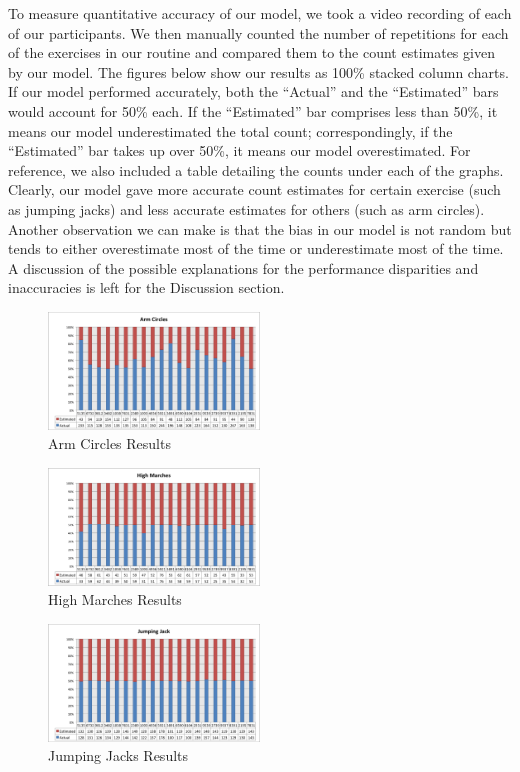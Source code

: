 To measure quantitative accuracy of our model, we took a video recording of each of our participants. We then manually counted the number of repetitions for each of the exercises in our routine and compared them to the count estimates given by our model. The figures below show our results as 100\% stacked column charts. If our model performed accurately, both the “Actual” and the “Estimated” bars would account for 50\% each. If the “Estimated” bar comprises less than 50\%, it means our model underestimated the total count; correspondingly, if the “Estimated” bar takes up over 50\%, it means our model overestimated. For reference, we also included a table detailing the counts under each of the graphs.\\
Clearly, our model gave more accurate count estimates for certain exercise (such as jumping jacks) and less accurate estimates for others (such as arm circles). Another observation we can make is that the bias in our model is not random but tends to either overestimate most of the time or underestimate most of the time. A discussion of the possible explanations for the performance disparities and inaccuracies is left for the Discussion section. \\
\begin{figure} [h!]
	\includegraphics[width=0.5\textwidth]{images/armcircles}
\caption{Arm Circles Results}
\end{figure}
\begin{figure} [h!]
	\includegraphics[width=0.5\textwidth]{images/highmarches}
\caption{High Marches Results}
\end{figure}
\begin{figure} [h!]
	\includegraphics[width=0.5\textwidth]{images/jumpingjack}
\caption{Jumping Jacks Results}
\end{figure}
